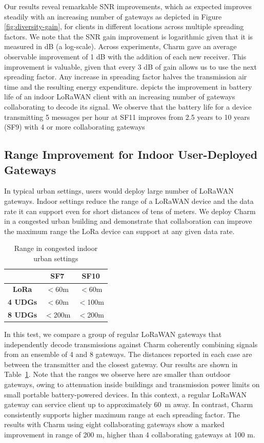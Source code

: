Our results reveal remarkable SNR improvements, which as expected improves
steadily with an increasing number of gateways as depicted in Figure
\ref{fig:diversity-gain}, for clients in different locations across multiple
spreading factors. We note that the SNR gain improvement is logarithmic given
that it is measured in dB (a log-scale). Across experiments, Charm gave an
average observable improvement of 1 dB with the addition of each new receiver.
This improvement is valuable, given that every 3 dB of gain allows us to use
the next spreading factor. Any increase in spreading factor halves the
transmission air time and the resulting energy expenditure.
 depicts the improvement in battery life of an
indoor LoRaWAN client with an increasing number of gateways collaborating to
decode its signal. We observe that the battery life for a device transmitting
5 messages per hour at SF11 improves from 2.5 years to 10 years (SF9) with 4
or more collaborating gateways


\subsection{Range Improvement for Indoor User-Deployed Gateways}

In typical urban settings, users would deploy large number of LoRaWAN
gateways. Indoor settings reduce the range of a LoRaWAN device and the data
rate it can support even for short distances of tens of meters. We deploy
Charm in a congested urban building and demonstrate that collaboration can
improve the maximum range the LoRa device can support at any given data rate.

\begin{table}[!htb]
\centering
\caption{Range in congested indoor urban settings}
\label{tab:range}
\begin{tabular}{||c | c | c||} 
 \hline
  & \textbf{SF7} & \textbf{SF10} \\ [0.5ex] 
 \hline\hline
 \textbf{LoRa} & $<$60m & $<$60m  \\ 
 \hline
 \textbf{4 UDGs} & $<$60m & $<$100m  \\
 \hline
 \textbf{8 UDGs} & $<$200m & $<$200m \\
 \hline
\end{tabular}
\end{table}

In this test, we compare a group of regular LoRaWAN gateways that
independently decode transmissions against Charm coherently combining signals
from an ensemble of 4 and 8 gateways. The distances reported in each case are
between the transmitter and the closest gateway. Our results are shown in
Table~\ref{tab:range}. Note that the ranges we observe here are smaller than
outdoor gateways, owing to attenuation inside buildings and transmission power
limits on small portable battery-powered devices. In this context, a regular
LoRaWAN gateway can service client up to approximately 60~m away. In contrast,
Charm consistently supports higher maximum range at each spreading factor. The
results with Charm using eight collaborating gateways show a marked
improvement in range of 200 m, higher than 4 collaborating gateways at 100 m.

